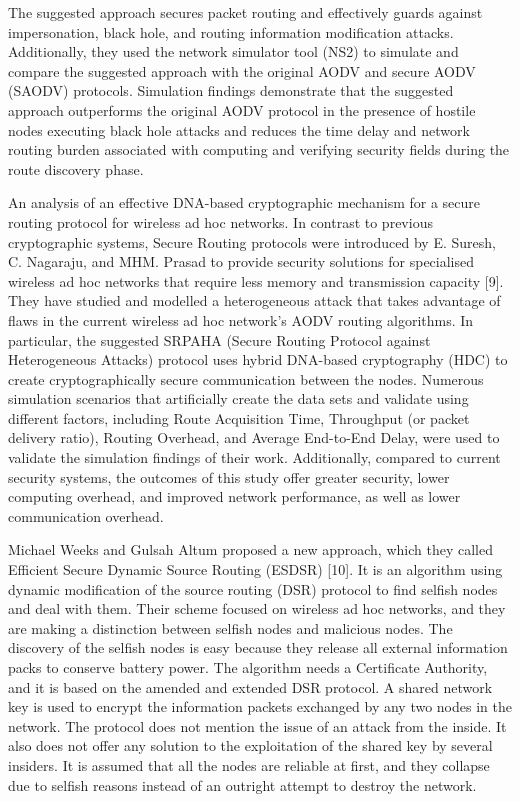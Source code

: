 \documentclass[10pt]{NSP1}
\begin{document}
The suggested approach secures packet routing and effectively guards against impersonation, black hole, and routing information modification attacks. Additionally, they used the network simulator tool (NS2) to simulate and compare the suggested approach with the original AODV and secure AODV (SAODV) protocols. Simulation findings demonstrate that the suggested approach outperforms the original AODV protocol in the presence of hostile nodes executing black hole attacks and reduces the time delay and network routing burden associated with computing and verifying security fields during the route discovery phase.

An analysis of an effective DNA-based cryptographic mechanism for a secure routing protocol for wireless ad hoc networks. In contrast to previous cryptographic systems, Secure Routing protocols were introduced by E. Suresh, C. Nagaraju, and MHM. Prasad to provide security solutions for specialised wireless ad hoc networks that require less memory and transmission capacity [9]. They have studied and modelled a heterogeneous attack that takes advantage of flaws in the current wireless ad hoc network's AODV routing algorithms. In particular, the suggested SRPAHA (Secure Routing Protocol against Heterogeneous Attacks) protocol uses hybrid DNA-based cryptography (HDC) to create cryptographically secure communication between the nodes. Numerous simulation scenarios that artificially create the data sets and validate using different factors, including Route Acquisition Time, Throughput (or packet delivery ratio), Routing Overhead, and Average End-to-End Delay, were used to validate the simulation findings of their work. Additionally, compared to current security systems, the outcomes of this study offer greater security, lower computing overhead, and improved network performance, as well as lower communication overhead.

Michael Weeks and Gulsah Altum proposed a new approach, which they called Efficient Secure Dynamic Source Routing (ESDSR) [10]. It is an algorithm using dynamic modification of the source routing (DSR) protocol to find selfish nodes and deal with them. Their scheme focused on wireless ad hoc networks, and they are making a distinction between selfish nodes and malicious nodes. The discovery of the selfish nodes is easy because they release all external information packs to conserve battery power. The algorithm needs a Certificate Authority, and it is based on the amended and extended DSR protocol. A shared network key is used to encrypt the information packets exchanged by any two nodes in the network. The protocol does not mention the issue of an attack from the inside. It also does not offer any solution to the exploitation of the shared key by several insiders. It is assumed that all the nodes are reliable at first, and they collapse due to selfish reasons instead of an outright attempt to destroy the network.
\end{document}
